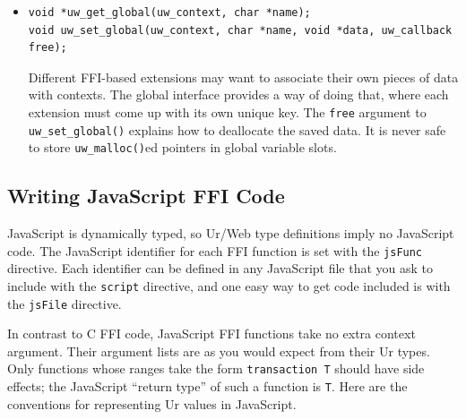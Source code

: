 \documentclass{article}
\begin{document}
\begin{itemize}
  When a request handler ends with multiple pending transactional actions, their handlers are run in a first-in-last-out stack-like order, wherever the order would otherwise be ambiguous.

  It is not safe for any of these handlers to access a context-local heap through a pointer returned previously by \texttt{uw\_malloc()}, nor should any new calls to that function be made.  Think of the context-local heap as meant for use by the Ur/Web code itself, while transactional handlers execute after the Ur/Web code has finished.

  A handler may signal an error by calling \texttt{uw\_set\_error\_message()}, but it is not safe to call \texttt{uw\_error()} from a handler.  Signaling an error in a commit handler will cause the runtime system to switch to aborting the transaction, immediately after the current commit handler returns. A handler that calls \texttt{uw\_error()} all the same is caught by the runtime system and treated as if it had set the message and returned.

  \item \begin{verbatim}
void *uw_get_global(uw_context, char *name);
void uw_set_global(uw_context, char *name, void *data, uw_callback free);
  \end{verbatim}
  Different FFI-based extensions may want to associate their own pieces of data with contexts.  The global interface provides a way of doing that, where each extension must come up with its own unique key.  The \texttt{free} argument to \texttt{uw\_set\_global()} explains how to deallocate the saved data.  It is never safe to store \texttt{uw\_malloc()}ed pointers in global variable slots.

\end{itemize}

\subsection{Writing JavaScript FFI Code}

JavaScript is dynamically typed, so Ur/Web type definitions imply no JavaScript code.  The JavaScript identifier for each FFI function is set with the \texttt{jsFunc} directive.  Each identifier can be defined in any JavaScript file that you ask to include with the \texttt{script} directive, and one easy way to get code included is with the \texttt{jsFile} directive.

In contrast to C FFI code, JavaScript FFI functions take no extra context argument.  Their argument lists are as you would expect from their Ur types.  Only functions whose ranges take the form \texttt{transaction T} should have side effects; the JavaScript ``return type'' of such a function is \texttt{T}.  Here are the conventions for representing Ur values in JavaScript.
\end{document}
